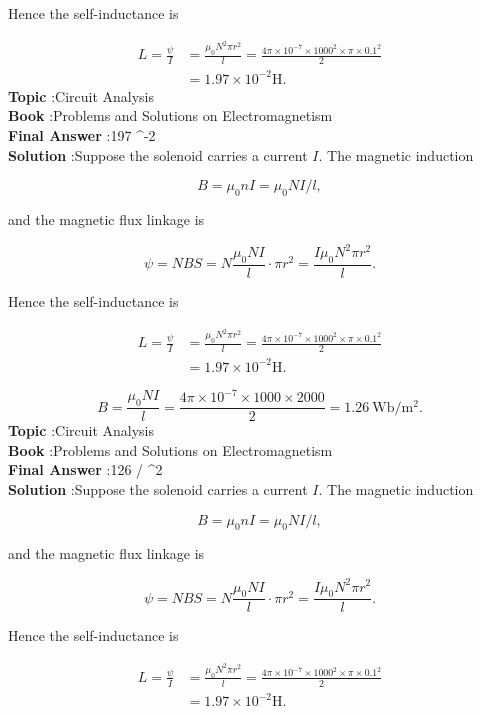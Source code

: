 \documentclass[10pt]{article}
\begin{document}
Hence the self-inductance is

$$
\begin{aligned}
L=\frac{\psi}{I} &=\frac{\mu_{0} N^{2} \pi r^{2}}{l}=\frac{4 \pi \times 10^{-7} \times 1000^{2} \times \pi \times 0.1^{2}}{2} \\
&=1.97 \times 10^{-2} \mathrm{H} .
\end{aligned}
$$
\textbf{Topic} :Circuit Analysis\\
\textbf{Book} :Problems and Solutions on Electromagnetism\\
\textbf{Final Answer} :197 ^{-2} \\


\textbf{Solution} :Suppose the solenoid carries a current $I$. The magnetic induction

$$
B=\mu_{0} n I=\mu_{0} N I / l,
$$

and the magnetic flux linkage is

$$
\psi=N B S=N \frac{\mu_{0} N I}{l} \cdot \pi r^{2}=\frac{I \mu_{0} N^{2} \pi r^{2}}{l} .
$$

Hence the self-inductance is

$$
\begin{aligned}
L=\frac{\psi}{I} &=\frac{\mu_{0} N^{2} \pi r^{2}}{l}=\frac{4 \pi \times 10^{-7} \times 1000^{2} \times \pi \times 0.1^{2}}{2} \\
&=1.97 \times 10^{-2} \mathrm{H} .
\end{aligned}
$$



$$
B=\frac{\mu_{0} N I}{l}=\frac{4 \pi \times 10^{-7} \times 1000 \times 2000}{2}=1.26 \mathrm{~Wb} / \mathrm{m}^{2} .
$$
\textbf{Topic} :Circuit Analysis\\
\textbf{Book} :Problems and Solutions on Electromagnetism\\
\textbf{Final Answer} :126  / ^{2}\\


\textbf{Solution} :Suppose the solenoid carries a current $I$. The magnetic induction

$$
B=\mu_{0} n I=\mu_{0} N I / l,
$$

and the magnetic flux linkage is

$$
\psi=N B S=N \frac{\mu_{0} N I}{l} \cdot \pi r^{2}=\frac{I \mu_{0} N^{2} \pi r^{2}}{l} .
$$

Hence the self-inductance is

$$
\begin{aligned}
L=\frac{\psi}{I} &=\frac{\mu_{0} N^{2} \pi r^{2}}{l}=\frac{4 \pi \times 10^{-7} \times 1000^{2} \times \pi \times 0.1^{2}}{2} \\
&=1.97 \times 10^{-2} \mathrm{H} .
\end{aligned}
$$
\end{document}
